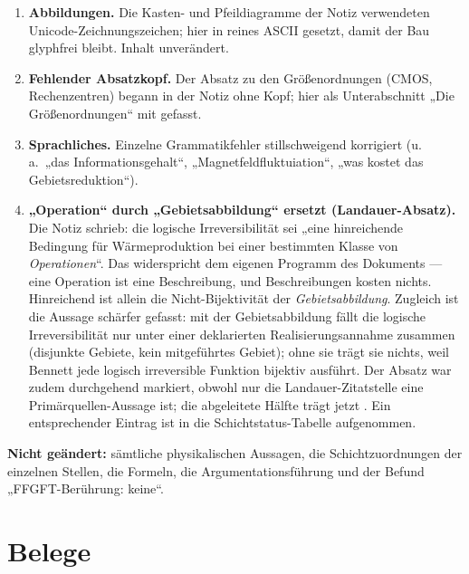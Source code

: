 \begin{enumerate}[leftmargin=1.6em,itemsep=0.4em]
        die logische Reihenfolge gebracht (Hardware $\ne$ Rechenoperation, dann
        Hardware-Seite, dann Dauerbetrieb, dann Quantencomputer) und als
        Unterabschnitte von Abschnitt~\ref{sec:inhalt} geführt.
  \item \textbf{Abbildungen.} Die Kasten- und Pfeildiagramme der Notiz verwendeten
        Unicode-Zeichnungszeichen; hier in reines ASCII gesetzt, damit der Bau
        glyphfrei bleibt. Inhalt unverändert.
  \item \textbf{Fehlender Absatzkopf.} Der Absatz zu den Größenordnungen
        (CMOS, Rechenzentren) begann in der Notiz ohne Kopf; hier als
        Unterabschnitt „Die Größenordnungen“ mit \LK gefasst.
  \item \textbf{Sprachliches.} Einzelne Grammatikfehler stillschweigend
        korrigiert (u.\,a.\ „das Informationsgehalt“, „Magnetfeldfluktuiation“,
        „was kostet das Gebietsreduktion“).
  \item \textbf{„Operation“ durch „Gebietsabbildung“ ersetzt (Landauer-Absatz).}
        Die Notiz schrieb: die logische Irreversibilität sei „eine hinreichende
        Bedingung für Wärmeproduktion bei einer bestimmten Klasse von
        \emph{Operationen}“. Das widerspricht dem eigenen Programm des Dokuments
        --- eine Operation ist eine Beschreibung, und Beschreibungen kosten
        nichts. Hinreichend ist allein die Nicht-Bijektivität der
        \emph{Gebietsabbildung}. Zugleich ist die Aussage schärfer gefasst: mit
        der Gebietsabbildung fällt die logische Irreversibilität nur unter einer
        deklarierten Realisierungsannahme zusammen (disjunkte Gebiete, kein
        mitgeführtes Gebiet); ohne sie trägt sie nichts, weil Bennett jede logisch
        irreversible Funktion bijektiv ausführt. Der Absatz war zudem
        durchgehend \LK markiert, obwohl nur die Landauer-Zitatstelle eine
        Primärquellen-Aussage ist; die abgeleitete Hälfte trägt jetzt \LB. Ein
        entsprechender Eintrag ist in die Schichtstatus-Tabelle aufgenommen.
\end{enumerate}

\textbf{Nicht geändert:} sämtliche physikalischen Aussagen, die Schichtzuordnungen
der einzelnen Stellen, die Formeln, die Argumentationsführung und der Befund
„FFGFT-Berührung: keine“.

\clearpage
{}
{}
\section*{Belege}

